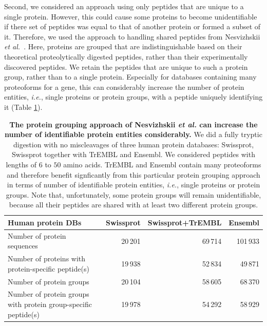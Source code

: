\documentclass{article}
\begin{document}
Second, we considered an approach using only peptides that are unique
to a single protein. However, this could cause some proteins to become
unidentifiable if there set of peptides was equal to that of another
protein or formed a subset of it. Therefore, we used the approach to
handling shared peptides from Nesvizhskii {\em et
al.}~\cite{nesvizhskii2003statistical}. Here, proteins are grouped
that are indistinguishable based on their theoretical proteolytically
digested peptides, rather than their experimentally discovered
peptides. We retain the peptides that are unique to such a protein
group, rather than to a single protein. Especially for databases
containing many proteoforms for a gene, this can considerably increase
the number of protein entities, {\em i.e.}, single proteins or protein
groups, with a peptide uniquely identifying it (Table
\ref{tab:duplicate-proteins}).

\begin{table}[!htp]
  \begin{center}
  
\begin{tabular}{|l|r|r|r|}
\hline
Human protein DBs & Swissprot & Swissprot+TrEMBL & Ensembl\\
\hline
Number of protein sequences & 20\,201 & 69\,714 & 101\,933\\
\hline
Number of proteins with protein-specific peptide(s) & 19\,938 & 52\,834 &
49\,871\\
\hline
Number of protein groups & 20\,104 & 58\,605 & 68\,370\\
\hline
Number of protein groups with protein group-specific peptide(s) & 19\,978 &
54\,292 & 58\,929\\
\hline
\end{tabular}

  \end{center}
  \caption{\label{tab:duplicate-proteins}\textbf{The protein grouping
approach of Nesvizhskii {\em et al.} can increase the number of
identifiable protein entities considerably.} We did a fully tryptic
digestion with no miscleavages of three human protein databases:
Swissprot, Swissprot together with TrEMBL and Ensembl. We considered
peptides with lengths of $6$ to $50$ amino acids. TrEMBL and Ensembl
contain many proteoforms and therefore benefit signficantly from this
particular protein grouping approach in terms of number of
identifiable protein entities, {\em i.e.}, single proteins or protein
groups. Note that, unfortunately, some protein groups will remain
unidentifiable, because all their peptides are shared with at least
two different protein groups.}
\end{table}
\end{document}
